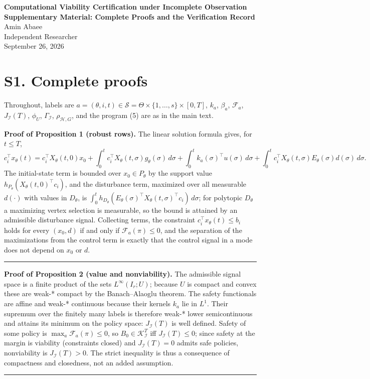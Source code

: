 \documentclass[10pt,article]{article}
\newcommand{\rulebar}{\begin{center}\rule{0.5\linewidth}{0.5pt}\end{center}}
\begin{document}
\begin{center}
{\Large\bfseries Computational Viability Certification under Incomplete Observation}\\[0.4em]
{\large\bfseries Supplementary Material: Complete Proofs and the Verification Record}\\[0.6em]
Amin Abaee\\
{\small Independent Researcher}\\
{\small September 26, 2026}
\end{center}

\section*{S1. Complete proofs}

Throughout, labels are \(a = (\theta, i, t) \in \mathscr S = \Theta \times
\{1,\dots,s\} \times [0,T]\), \(k_a\), \(\beta_a\), \(\mathcal F_a\),
\(J_{\mathcal I}(T)\), \(\phi_U\), \(\Gamma_{\mathcal I}\),
\(\rho_{\mathcal H,G}\), and the program (5) are as in the main text.

\textbf{Proof of Proposition 1 (robust rows).} The linear solution formula
gives, for \(t \le T\),
\[
c_i^\top x_\theta(t) = c_i^\top X_\theta(t,0)x_0 + \int_0^t c_i^\top
X_\theta(t,\sigma) g_\theta(\sigma)\,d\sigma + \int_0^t k_a(\sigma)^\top
u(\sigma)\, d\sigma + \int_0^t c_i^\top X_\theta(t,\sigma)E_\theta(\sigma)
d(\sigma)\, d\sigma .
\]
The initial-state term is bounded over \(x_0 \in P_\theta\) by the support
value \(h_{P_\theta}(X_\theta(t,0)^\top c_i)\), and the disturbance term,
maximized over all measurable \(d(\cdot)\) with values in \(D_\theta\), is
\(\int_0^t h_{D_\theta}(E_\theta(\sigma)^\top X_\theta(t,\sigma)^\top
c_i)\, d\sigma\); for polytopic \(D_\theta\) a maximizing vertex selection is
measurable, so the bound is attained by an admissible disturbance signal.
Collecting terms, the constraint \(c_i^\top x_\theta(t) \le b_i\) holds for
every \((x_0, d)\) if and only if \(\mathcal F_a(\pi) \le 0\), and the
separation of the maximizations from the control term is exactly that the
control signal in a mode does not depend on \(x_0\) or \(d\).
\rulebar

\textbf{Proof of Proposition 2 (value and nonviability).} The admissible
signal space is a finite product of the sets \(L^\infty(I_r; U)\); because
\(U\) is compact and convex these are weak-* compact by the Banach--Alaoglu
theorem. The safety functionals are affine and weak-* continuous because
their kernels \(k_a\) lie in \(L^1\). Their supremum over the finitely many
labels is therefore weak-* lower semicontinuous and attains its minimum on
the policy space: \(J_{\mathcal I}(T)\) is well defined. Safety of some
policy is \(\max_a \mathcal F_a(\pi) \le 0\), so \(B_0 \in
\mathcal K_{\mathcal I}^T\) iff \(J_{\mathcal I}(T) \le 0\); since safety at
the margin is viability (constraints closed) and \(J_{\mathcal I}(T) = 0\)
admits safe policies, nonviability is \(J_{\mathcal I}(T) > 0\). The strict
inequality is thus a consequence of compactness and closedness, not an added
assumption.
\rulebar
\end{document}
